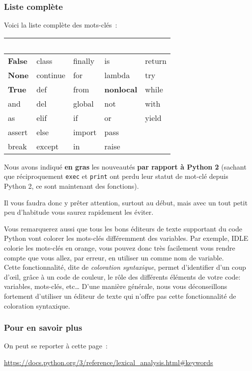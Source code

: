     \hypertarget{liste-compluxe8te}{%
\subsubsection{Liste complète}\label{liste-compluxe8te}}

    Voici la liste complète des mots-clés~:

    \begin{longtable}[]{@{}lllll@{}}
~ & ~ & ~ & ~ & ~\tabularnewline
\midrule
\endhead
\textbf{False} & class & finally & is & return\tabularnewline
\textbf{None} & continue & for & lambda & try\tabularnewline
\textbf{True} & def & from & \textbf{nonlocal} & while\tabularnewline
and & del & global & not & with\tabularnewline
as & elif & if & or & yield\tabularnewline
assert & else & import & pass &\tabularnewline
break & except & in & raise &\tabularnewline
\bottomrule
\end{longtable}

    Nous avons indiqué \textbf{en gras} les nouveautés \textbf{par rapport à
Python 2} (sachant que réciproquement \texttt{exec} et \texttt{print}
ont perdu leur statut de mot-clé depuis Python 2, ce sont maintenant des
fonctions).

    Il vous faudra donc y prêter attention, surtout au début, mais avec un
tout petit peu d'habitude vous saurez rapidement les éviter.

Vous remarquerez aussi que tous les bons éditeurs de texte supportant du
code Python vont colorer les mots-clés différemment des variables. Par
exemple, IDLE colorie les mots-clés en orange, vous pouvez donc très
facilement vous rendre compte que vous allez, par erreur, en utiliser un
comme nom de variable.\\

Cette fonctionnalité, dite de \emph{coloration syntaxique}, permet
d'identifier d'un coup d'œil, grâce à un code de couleur, le rôle des
différents éléments de votre code: variables, mots-clés, etc\ldots{}
D'une manière générale, nous vous déconseillons fortement d'utiliser un
éditeur de texte qui n'offre pas cette fonctionnalité de coloration
syntaxique.

    \hypertarget{pour-en-savoir-plus}{%
\subsubsection{Pour en savoir plus}\label{pour-en-savoir-plus}}

    On peut se reporter à cette page~:

\href{https://docs.python.org/3/reference/lexical\_analysis.html\#keywords}{https://docs.python.org/3/reference/lexical\_analysis.html\#keywords}